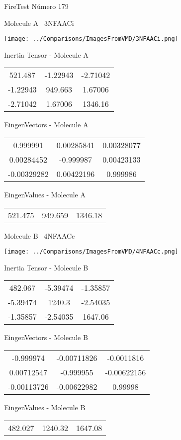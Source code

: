 \vtab[-3cm]
\begin{center}
{\large FireTest \tab Número 179}
\end{center}
\begin{multicols}{2}
\begin{center}

Molecule A \
3NFAACi

\texttt{[image: ../Comparisons/ImagesFromVMD/3NFAACi.png]}

Inertia Tensor - Molecule A \\
\begin{tabular}{|c c c|}
521.487	 & 	-1.22943	 & 	-2.71042	 \\
-1.22943	 & 	949.663	 & 	1.67006	 \\
-2.71042	 & 	1.67006	 & 	1346.16
\end{tabular}

\vtab
 EingenVectors - Molecule A     \\
\begin{tabular}{|c c c|}
0.999991	 & 	0.00285841	 & 	0.00328077	 \\
0.00284452	 & 	-0.999987	 & 	0.00423133	 \\
-0.00329282	 & 	0.00422196	 & 	0.999986
\end{tabular}

\vtab
 EingenValues - Molecule A     \\
\begin{tabular}{|c c c|}
521.475	 & 	949.659	 & 	1346.18	 \\
\end{tabular}
\columnbreak

Molecule B \
4NFAACc

\texttt{[image: ../Comparisons/ImagesFromVMD/4NFAACc.png]}

Inertia Tensor - Molecule B \\
\begin{tabular}{|c c c|}
482.067	 & 	-5.39474	 & 	-1.35857	 \\
-5.39474	 & 	1240.3	 & 	-2.54035	 \\
-1.35857	 & 	-2.54035	 & 	1647.06
\end{tabular}

\vtab
 EingenVectors - Molecule B     \\
\begin{tabular}{|c c c|}
-0.999974	 & 	-0.00711826	 & 	-0.0011816	 \\
0.00712547	 & 	-0.999955	 & 	-0.00622156	 \\
-0.00113726	 & 	-0.00622982	 & 	0.99998
\end{tabular}

\vtab
 EingenValues - Molecule B     \\
\begin{tabular}{|c c c|}
482.027	 & 	1240.32	 & 	1647.08	 \\
\end{tabular}

\end{center}
\end{multicols}

